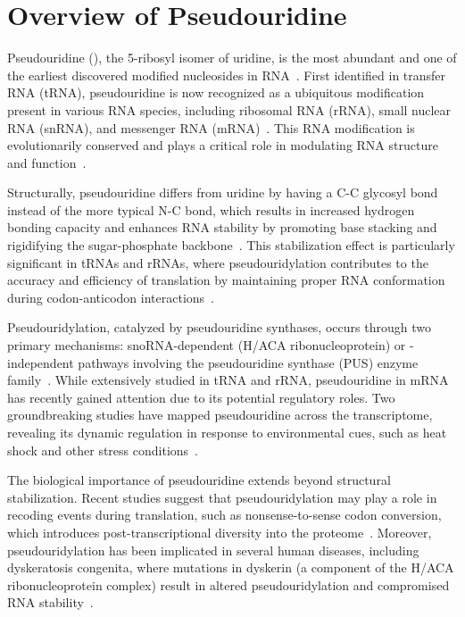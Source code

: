 \section{Overview of Pseudouridine}
  \label{sec:introduction-overview}

  Pseudouridine (\pseudo), the 5-ribosyl isomer of uridine, is the most abundant and one of the earliest discovered modified nucleosides in RNA~\cite{charette_pseudouridine_2000}.
  First identified in transfer RNA (tRNA), pseudouridine is now recognized as a ubiquitous modification present in various
  RNA species, including ribosomal RNA (rRNA), small nuclear RNA (snRNA), and messenger RNA (mRNA)~\cite{cohn_nucleoside-5-phosphates_1951}.
  This RNA modification is evolutionarily conserved and plays a critical role in modulating RNA structure and function~\cite{ge_rna_2013}.

  Structurally, pseudouridine differs from uridine by having a C-C glycosyl bond instead of the more typical N-C bond, which results in increased hydrogen bonding capacity and enhances RNA stability by promoting base stacking and rigidifying the sugar-phosphate backbone~\cite{charette_pseudouridine_2000}.
  This stabilization effect is particularly significant in tRNAs and rRNAs, where pseudouridylation contributes to the accuracy and efficiency of translation by maintaining proper RNA conformation during codon-anticodon interactions~\cite{schwartz_transcriptome-wide_2014}.

  Pseudouridylation, catalyzed by pseudouridine synthases, occurs through two primary mechanisms: snoRNA-dependent (H/ACA ribonucleoprotein) or -independent pathways involving the pseudouridine synthase (PUS) enzyme family~\cite{carlile_pseudouridine_2014}.
  While extensively studied in tRNA and rRNA, pseudouridine in mRNA has recently gained attention due to its potential regulatory roles.
  Two groundbreaking studies have mapped pseudouridine across the transcriptome, revealing its dynamic regulation in response to environmental cues, such as heat shock and other stress conditions~\cite{carlile_pseudouridine_2014,schwartz_transcriptome-wide_2014}.

  The biological importance of pseudouridine extends beyond structural stabilization.
  Recent studies suggest that pseudouridylation may play a role in recoding events during translation, such as nonsense-to-sense codon conversion, which introduces post-transcriptional diversity into the proteome~\cite{karijolich_converting_2011}.
  Moreover, pseudouridylation has been implicated in several human diseases, including dyskeratosis congenita, where mutations in dyskerin (a component of the H/ACA ribonucleoprotein complex) result in altered pseudouridylation and compromised RNA stability~\cite{schwartz_transcriptome-wide_2014}.

